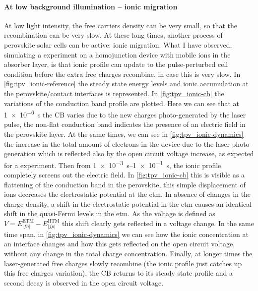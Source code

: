 		\paragraph{At low background illumination -- ionic migration}\label{tpv_biexp_lowlight_ions}
		At low light intensity, the free carriers density can be very small, so that the recombination can be very slow.
		At these long times, another process of perovskite solar cells can be active: ionic migration.
		What I have observed, simulating a  experiment on a homojunction device with mobile ions in the absorber layer, is that ionic profile can update to the pulse\hyp{}perturbed cell condition before the extra free charges recombine, in case this is very slow.
		In \cref{fig:tpv_ionic-reference} the steady state energy levels and ionic accumulation at the perovskite/contact interfaces is represented.
		In \cref{fig:tpv_ionic-cb} the variations of the conduction band profile are plotted.
		Here we can see that at \SI{1e-6}{s} the CB varies due to the new charges photo\hyp{}generated by the laser pulse, the non-flat conduction band indicates the presence of an electric field in the perovskite layer.
		At the same times, we can see in \cref{fig:tpv_ionic-dynamics} the increase in the total amount of electrons in the device due to the laser photo-generation which is reflected also by the open circuit voltage increase, as expected for a  experiment.
		Then from \SIrange{1e-3}{1e-1}{s}, the ionic profile completely screens out the electric field.
		In \cref{fig:tpv_ionic-cb} this is visible as a flattening of the conduction band in the perovskite, this simple displacement of ions decreases the electrostatic potential at the \gls{etm}.
		In absence of changes in the charge density, a shift in the electrostatic potential in the \gls{etm} causes an identical shift in the quasi-Fermi levels in the \gls{etm}.
		As the voltage is defined as $V = E_|fn|^{\mathrm{ETM}} - E_|fp|^{\mathrm{HTM}}$ this shift clearly gets reflected in a voltage change.
		In the same time span, in \cref{fig:tpv_ionic-dynamics} we can see how the ionic concentration at an interface changes and how this gets reflected on the open circuit voltage, without any change in the total charge concentration.
		Finally, at longer times the laser\hyp{}generated free charges slowly recombine (the ionic profile just catches up this free charges variation), the CB returns to its steady state profile and a second decay is observed in the open circuit voltage.
